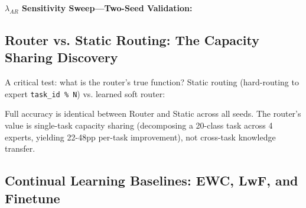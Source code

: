 \documentclass[twoside]{article}
\theoremstyle{definition}
\begin{document}
\textbf{$\lambda_{AR}$ Sensitivity Sweep---Two-Seed Validation:}

\begin{table}[ht]
\centering
\caption{Full $\lambda_{AR}$ sweep (s=42 + s=123)}
\end{table}

\subsection{Router vs. Static Routing: The Capacity Sharing Discovery}

A critical test: what is the router's true function? Static routing (hard-routing to expert \texttt{task\_id \% N}) vs. learned soft router:

\begin{table}[ht]
\centering
\caption{Router vs. Static routing (5-task, 3 seeds)}
\end{table}

Full accuracy is identical between Router and Static across all seeds. The router's value is single-task capacity sharing (decomposing a 20-class task across 4 experts, yielding 22-48pp per-task improvement), not cross-task knowledge transfer.

\subsection{Continual Learning Baselines: EWC, LwF, and Finetune}
\end{document}
